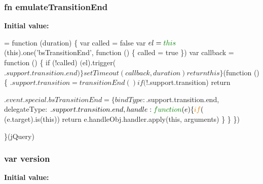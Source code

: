 \subsubsection[{emulate\+Transition\+End}]{\setlength{\rightskip}{0pt plus 5cm}fn emulate\+Transition\+End}\label{bootstrap_8js_a2eb5ccc0cd870ff2cc5ce9b8d53cec48}
{\bfseries Initial value\+:}
\begin{DoxyCode}
= \textcolor{keyword}{function} (duration) \{
    var called = \textcolor{keyword}{false}
    var $el = \textcolor{keyword}{this}
    $(\textcolor{keyword}{this}).one(\textcolor{stringliteral}{'bsTransitionEnd'}, \textcolor{keyword}{function} () \{ called = \textcolor{keyword}{true} \})
    var callback = \textcolor{keyword}{function} () \{ \textcolor{keywordflow}{if} (!called) $($el).trigger($.support.transition.end) \}
    setTimeout(callback, duration)
    return this
  \}

  $(function () \{
    $.support.transition = transitionEnd()

    if (!$.support.transition) return

    $.event.special.bsTransitionEnd = \{
      bindType: $.support.transition.end,
      delegateType: $.support.transition.end,
      handle: \textcolor{keyword}{function} (e) \{
        \textcolor{keywordflow}{if} ($(e.target).is(\textcolor{keyword}{this})) \textcolor{keywordflow}{return} e.handleObj.handler.apply(\textcolor{keyword}{this}, arguments)
      \}
    \}
  \})

\}(jQuery)
\end{DoxyCode}
\subsubsection[{version}]{\setlength{\rightskip}{0pt plus 5cm}var version}\label{bootstrap_8js_a614229fff4211edebc3c193d1e7763ec}
{\bfseries Initial value\+:}

